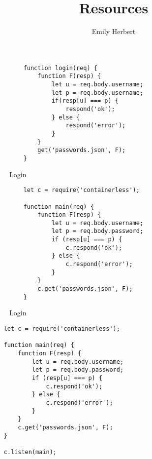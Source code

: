 \documentclass[sigplan,10pt,review=false,nonacm=true]{acmart}
\begin{document}
\title{Resources}
\author{Emily Herbert}

\maketitle

\begin{figure}
\lstset{language=JavaScript}
\begin{lstlisting}
    function login(req) {
        function F(resp) {
            let u = req.body.username;
            let p = req.body.username;
            if(resp[u] === p) {
                respond('ok');
            } else {
                respond('error');
            }
        }
        get('passwords.json', F);
    }
\end{lstlisting}
\caption{Login}
\end{figure}

\begin{figure}
\lstset{language=JavaScript}
\begin{lstlisting}
    let c = require('containerless');

    function main(req) {
        function F(resp) {
            let u = req.body.username;
            let p = req.body.password;
            if (resp[u] === p) {
                c.respond('ok');
            } else {
                c.respond('error');
            }
        }
        c.get('passwords.json', F);
    }
\end{lstlisting}
\caption{Login}
\end{figure}

\begin{figure*}
\lstset{language=JavaScript}
\begin{lstlisting}
    let c = require('containerless');

    function main(req) {
        function F(resp) {
            let u = req.body.username;
            let p = req.body.password;
            if (resp[u] === p) {
                c.respond('ok');
            } else {
                c.respond('error');
            }
        }
        c.get('passwords.json', F);
    }

    c.listen(main);
\end{lstlisting}
\label{login-example-instrumented}
\end{figure*}
\end{document}
